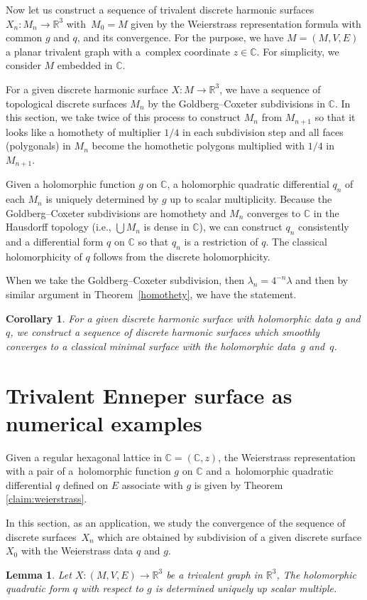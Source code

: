 \documentclass[10pt,a4paper]{amsart}
\newcommand{\R}{\mathbb{R}}
\newcommand{\C}{\mathbb{C}}
\newcommand{\1}{{\bf 1}}
\numberwithin{equation}{section}
\newtheorem{Corollary}[Theorem]{Corollary}
\newtheorem{Lemma}[Theorem]{Lemma}
\begin{document}
Now let us construct a sequence of trivalent discrete harmonic surfaces $X_n\colon M_n \to \R^3 $ with~$M_0 =M$ given by the Weierstrass representation formula with common $g$ and $q$, and its convergence.
For the purpose, we have $M=(M,V,E)$ a planar trivalent graph with a~complex coordinate $z \in \C$. For simplicity, we consider $M$ embedded in $\C$.

For a given discrete harmonic surface $X\colon M \to \R^3$,
we have a sequence of topological discrete surfaces $M_n$ by the Goldberg--Coxeter subdivisions in $\C$.
In this section, we take twice of this process to construct $M_n$ from $M_{n+1}$ so that it looks like a homothety of multiplier $1/4$
in each subdivision step and all faces (polygonals) in $M_n$ become the homothetic polygons multiplied with $1/4$ in $M_{n+1}$.

Given a holomorphic function $g$ on $\C$, a holomorphic quadratic differential $q_n$ of each $M_n$ is uniquely determined
by $g$ up to scalar multiplicity.
Because the Goldberg--Coxeter subdivisions are homothety and $M_n$ converges to $\C$ in the Hausdorff topology
(i.e., $\bigcup M_n$ is dense in $\C$),
we can construct $q_n$ consistently and a differential form $q$ on $\C$ so that $q_n$ is a restriction of $q$.
The classical holomorphicity of $q$ follows from the discrete holomorphicity.

When we take the Goldberg--Coxeter subdivision,
then $\lambda_n = 4^{-n} \lambda$ and then by similar argument in Theorem~\ref{homothety}, we have the statement.

\begin{Corollary} \label{claim:homothety:cor}
 For a given discrete harmonic surface with holomorphic data $g$ and $q$,
 we construct a sequence of discrete harmonic surfaces which smoothly converges to a classical minimal surface
 with the holomorphic data~$g$ and~$q$.
\end{Corollary}

\section{Trivalent Enneper surface as numerical examples}\label{sec:numerics}

Given a regular hexagonal lattice in $\C =(\C, z)$,
the Weierstrass representation with a pair of a~holomorphic function $g$ on $\C$ and a~holomorphic quadratic differential $q$ defined on $E$ associate with $g$ is given by Theorem \ref{claim:weierstrass}.

In this section, as an application,
we study the convergence of the sequence of discrete surfaces~$X_n$ which are obtained
by subdivision of a given discrete surface $X_0$ with the Weierstrass data $q$ and $g$.
\begin{Lemma}
 \label{claim:lemma:8:1}
 Let $X\colon  (M,V,E) \to \R^3$ be a trivalent graph in $\R^3$,
 The holomorphic quadratic form $q$ with respect to $g$ is determined uniquely up scalar multiple.
\end{Lemma}
\end{document}
